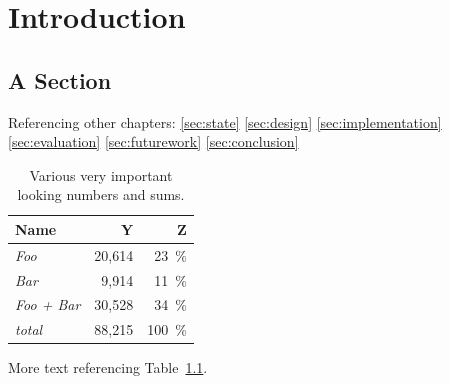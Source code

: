 \chapter{Introduction}
\label{sec:intro}





\section{A Section}

Referencing other chapters: \ref{sec:state} \ref{sec:design}
\ref{sec:implementation} \ref{sec:evaluation} \ref{sec:futurework}
\ref{sec:conclusion}

\begin{table}[htp]
    \centering
    \begin{tabular}{lrr}
        \textbf{Name}      & \textbf{Y} & \textbf{Z}         \\
        \hline
        \textit{Foo}       & 20,614     & \SI{23}{\percent}  \\
        \textit{Bar}       & 9,914      & \SI{11}{\percent}  \\
        \textit{Foo + Bar} & 30,528     & \SI{34}{\percent}  \\
        \hline
        \textit{total}     & 88,215     & \SI{100}{\percent} \\

    \end{tabular}
    \caption[Some interesting numbers]{Various very important looking numbers and sums.}
    \label{tab:numbers}
\end{table}

More text referencing Table~\ref{tab:numbers}.

